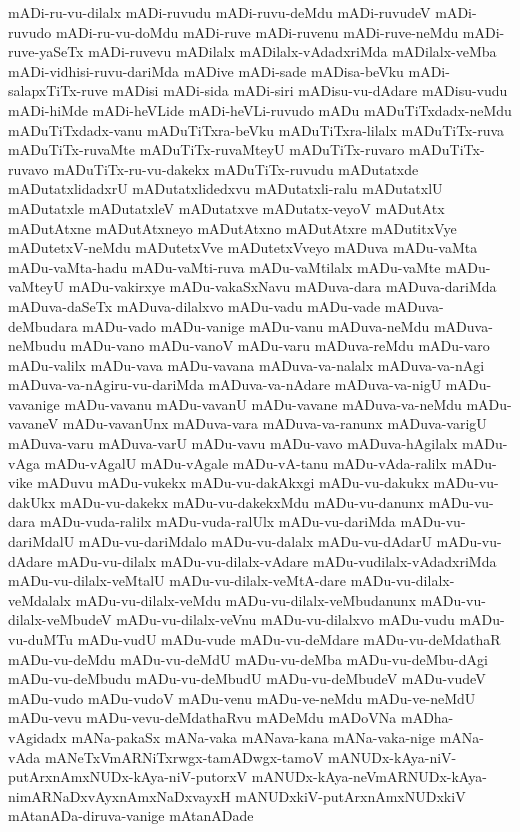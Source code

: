{mADi-ru-vu-dilalx
mADi-ruvudu
mADi-ruvu-deMdu
mADi-ruvudeV
mADi-ruvudo
mADi-ru-vu-doMdu
mADi-ruve
mADi-ruvenu
mADi-ruve-neMdu
mADi-ruve-yaSeTx
mADi-ruvevu
mADilalx
mADilalx-vAdadxriMda
mADilalx-veMba
mADi-vidhisi-ruvu-dariMda
mADive
mADi-sade
mADisa-beVku
mADi-salapxTiTx-ruve
mADisi
mADi-sida
mADi-siri
mADisu-vu-dAdare
mADisu-vudu
mADi-hiMde
mADi-heVLide
mADi-heVLi-ruvudo
mADu
mADuTiTxdadx-neMdu
mADuTiTxdadx-vanu
mADuTiTxra-beVku
mADuTiTxra-lilalx
mADuTiTx-ruva
mADuTiTx-ruvaMte
mADuTiTx-ruvaMteyU
mADuTiTx-ruvaro
mADuTiTx-ruvavo
mADuTiTx-ru-vu-dakekx
mADuTiTx-ruvudu
mADutatxde
mADutatxlidadxrU
mADutatxlidedxvu
mADutatxli-ralu
mADutatxlU
mADutatxle
mADutatxleV
mADutatxve
mADutatx-veyoV
mADutAtx
mADutAtxne
mADutAtxneyo
mADutAtxno
mADutAtxre
mADutitxVye
mADutetxV-neMdu
mADutetxVve
mADutetxVveyo
mADuva
mADu-vaMta
mADu-vaMta-hadu
mADu-vaMti-ruva
mADu-vaMtilalx
mADu-vaMte
mADu-vaMteyU
mADu-vakirxye
mADu-vakaSxNavu
mADuva-dara
mADuva-dariMda
mADuva-daSeTx
mADuva-dilalxvo
mADu-vadu
mADu-vade
mADuva-deMbudara
mADu-vado
mADu-vanige
mADu-vanu
mADuva-neMdu
mADuva-neMbudu
mADu-vano
mADu-vanoV
mADu-varu
mADuva-reMdu
mADu-varo
mADu-valilx
mADu-vava
mADu-vavana
mADuva-va-nalalx
mADuva-va-nAgi
mADuva-va-nAgiru-vu-dariMda
mADuva-va-nAdare
mADuva-va-nigU
mADu-vavanige
mADu-vavanu
mADu-vavanU
mADu-vavane
mADuva-va-neMdu
mADu-vavaneV
mADu-vavanUnx
mADuva-vara
mADuva-va-ranunx
mADuva-varigU
mADuva-varu
mADuva-varU
mADu-vavu
mADu-vavo
mADuva-hAgilalx
mADu-vAga
mADu-vAgalU
mADu-vAgale
mADu-vA-tanu
mADu-vAda-ralilx
mADu-vike
mADuvu
mADu-vukekx
mADu-vu-dakAkxgi
mADu-vu-dakukx
mADu-vu-dakUkx
mADu-vu-dakekx
mADu-vu-dakekxMdu
mADu-vu-danunx
mADu-vu-dara
mADu-vuda-ralilx
mADu-vuda-ralUlx
mADu-vu-dariMda
mADu-vu-dariMdalU
mADu-vu-dariMdalo
mADu-vu-dalalx
mADu-vu-dAdarU
mADu-vu-dAdare
mADu-vu-dilalx
mADu-vu-dilalx-vAdare
mADu-vudilalx-vAdadxriMda
mADu-vu-dilalx-veMtalU
mADu-vu-dilalx-veMtA-dare
mADu-vu-dilalx-veMdalalx
mADu-vu-dilalx-veMdu
mADu-vu-dilalx-veMbudanunx
mADu-vu-dilalx-veMbudeV
mADu-vu-dilalx-veVnu
mADu-vu-dilalxvo
mADu-vudu
mADu-vu-duMTu
mADu-vudU
mADu-vude
mADu-vu-deMdare
mADu-vu-deMdathaR
mADu-vu-deMdu
mADu-vu-deMdU
mADu-vu-deMba
mADu-vu-deMbu-dAgi
mADu-vu-deMbudu
mADu-vu-deMbudU
mADu-vu-deMbudeV
mADu-vudeV
mADu-vudo
mADu-vudoV
mADu-venu
mADu-ve-neMdu
mADu-ve-neMdU
mADu-vevu
mADu-vevu-deMdathaRvu
mADeMdu
mADoVNa
mADha-vAgidadx
mANa-pakaSx
mANa-vaka
mANava-kana
mANa-vaka-nige
mANa-vAda
mANeTxVmARNiTxrwgx-tamADwgx-tamoV
mANUDx-kAya-niV-putArxnAmxNUDx-kAya-niV-putorxV
mANUDx-kAya-neVmARNUDx-kAya-nimARNaDxvAyxnAmxNaDxvayxH
mANUDxkiV-putArxnAmxNUDxkiV
mAtanADa-diruva-vanige
mAtanADade
}
